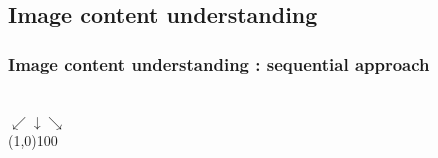 	\subsection[Understanding]{Image content understanding}
		\begin{frame}
		\frametitle{Image content understanding : sequential approach}
		\begin{center}
			\\
			$\swarrow \downarrow \searrow$\\
			\line(1,0){100}\\
			

\end{center}
\end{frame}
